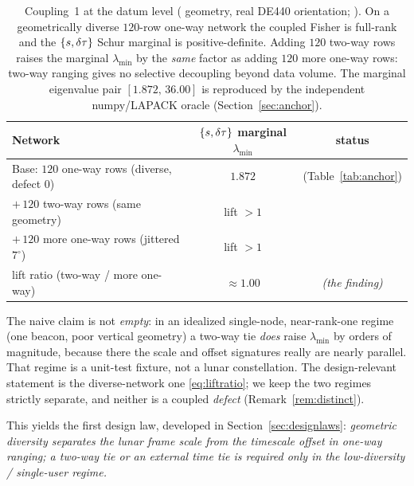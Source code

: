 \begin{table}[t]
\centering
\caption{Coupling~1 at the datum level (\Modelled{} geometry, real DE440 orientation;
\modtag{}). On a geometrically diverse $120$-row one-way network the coupled Fisher is
full-rank and the $\{s,\delta\tau\}$ Schur marginal is positive-definite. Adding $120$ two-way
rows raises the marginal $\lambda_{\min}$ by the \emph{same} factor as adding $120$ more
one-way rows: two-way ranging gives no selective decoupling beyond data volume. The
marginal eigenvalue pair $[1.872,\,36.00]$ is reproduced by the independent numpy/LAPACK
oracle (Section~\ref{sec:anchor}).}
\label{tab:coupling1}
\small
\begin{tabular}{@{}lcc@{}}
\toprule
\textbf{Network} & $\{s,\delta\tau\}$ marginal $\lambda_{\min}$ & \textbf{status} \\
\midrule
Base: $120$ one-way rows (diverse, defect $0$) & $1.872$ & \Validated{} (Table~\ref{tab:anchor}) \\
$+\,120$ two-way rows (same geometry)          & lift $>1$ & \Modelled{} \\
$+\,120$ more one-way rows (jittered $7^\circ$) & lift $>1$ & \Modelled{} \\
lift ratio (two-way / more one-way)             & $\approx1.00$ & \Modelled{} \emph{(the finding)} \\
\bottomrule
\end{tabular}
\end{table}

\begin{remark}
\label{rem:singlenode}
The naive claim is not \emph{empty}: in an idealized single-node, near-rank-one regime
(one beacon, poor vertical geometry) a two-way tie \emph{does} raise $\lambda_{\min}$ by
orders of magnitude, because there the scale and offset signatures really are nearly
parallel. That regime is a unit-test fixture, not a lunar constellation. The design-relevant
statement is the diverse-network one \eqref{eq:liftratio}; we keep the two regimes strictly
separate, and neither is a coupled \emph{defect} (Remark~\ref{rem:distinct}).
\end{remark}

This yields the first design law, developed in Section~\ref{sec:designlaws}:
\emph{geometric diversity separates the lunar frame scale from the timescale offset in
one-way ranging; a two-way tie or an external time tie is required only in the
low-diversity / single-user regime.}

